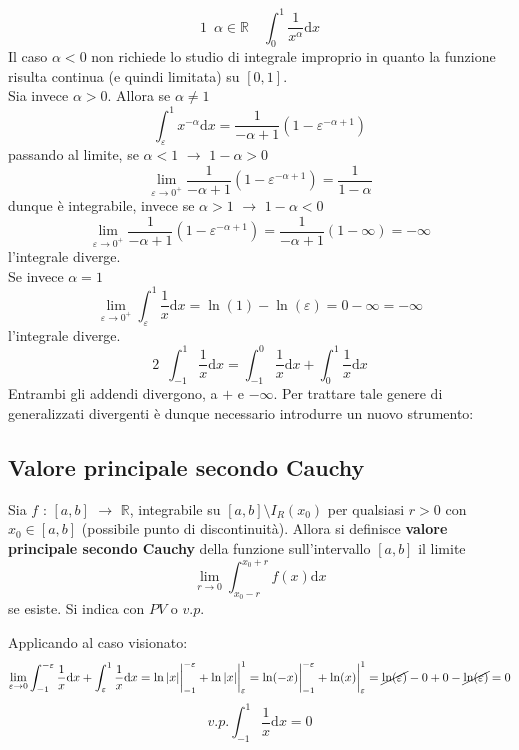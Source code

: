 \documentclass[10pt, oneside]{book}
\theoremstyle{plain}
\begin{document}
\[\boxed{1} \enspace \alpha \in \mathbb{R} \quad \int_0^1 \frac{1}{x^\alpha}\textrm{d}x\]
Il caso $\alpha < 0$ non richiede lo studio di integrale improprio in quanto la funzione risulta continua (e quindi limitata) su $[0,1]$.
\\Sia invece $\alpha > 0$. Allora se $\alpha \neq 1$
\[\int_\varepsilon^1 x^{-\alpha}\textrm{d}x = \frac{1}{-\alpha + 1}(1 - \varepsilon^{-\alpha + 1})\]
passando al limite, se $\alpha < 1$ $\rightarrow$ $1 - \alpha > 0$
\[\lim\limits_{\varepsilon \rightarrow 0^+} \frac{1}{-\alpha + 1}(1 - \varepsilon^{-\alpha + 1}) = \frac{1}{1 - \alpha}\]
dunque è integrabile, invece se $\alpha > 1$ $\rightarrow$ $1- \alpha <0$
\[\lim\limits_{\varepsilon \rightarrow 0^+} \frac{1}{-\alpha + 1}(1 - \varepsilon^{-\alpha + 1}) = \frac{1}{-\alpha + 1}(1 - \infty) = - \infty\]
l'integrale diverge.
\\Se invece $\alpha = 1$
\[\lim\limits_{\varepsilon \rightarrow 0^+} \int_\varepsilon^1 \frac{1}{x}\textrm{d}x = \ln(1) - \ln(\varepsilon) = 0 - \infty = - \infty\]
l'integrale diverge.
\[\boxed{2} \enspace \int_{-1}^1 \frac{1}{x}\textrm{d}x = \int_{-1}^0 \frac{1}{x}\textrm{d}x + \int_{0}^1 \frac{1}{x}\textrm{d}x\]
Entrambi gli addendi divergono, a $+$ e $- \infty$. Per trattare tale genere di generalizzati divergenti è dunque necessario introdurre un nuovo strumento:

\subsection{Valore principale secondo Cauchy}
\begin{defin}
    Sia $f$ : $[a,b]$ $\rightarrow$ $\mathbb{R}$, integrabile su $[a,b] \setminus I_R(x_0)$ per qualsiasi $r>0$ con $x_0 \in [a,b]$ (possibile punto di discontinuità). Allora si definisce \textbf{valore principale secondo Cauchy} della funzione sull'intervallo $[a,b]$ il limite
    \[\lim\limits_{r \rightarrow 0} \int_{x_0 - r}^{x_0 + r} f(x) \textrm{d}x\]
    se esiste. Si indica con $PV$ o $v.p.$
\end{defin}

Applicando al caso visionato:
\[\lim\limits_{\varepsilon \rightarrow 0} \int_{-1}^{-\varepsilon} \frac{1}{x}\textrm{d}x + \int_{\varepsilon}^1 \frac{1}{x}\textrm{d}x = \ln|x|\bigg|_{-1}^{-\varepsilon} + \ln|x|\bigg|_{\varepsilon}^1 = \ln(-x)\bigg|_{-1}^{-\varepsilon} + \ln(x)\bigg|_{\varepsilon}^1 = \cancel{\ln(\varepsilon)} - 0 + 0 - \cancel{\ln(\varepsilon)} = 0\]
\[v.p. \int_{-1}^1 \frac{1}{x}\textrm{d}x = 0\]
\end{document}
